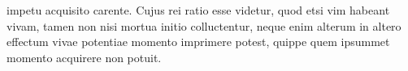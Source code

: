 %
impetu%
\protect{}
acquisito carente.
%
Cujus rei ratio esse videtur,
quod etsi vim habeant vivam,%
\protect{}
tamen non nisi mortua%
\protect{} 
%
initio colluctentur,
neque enim alterum in altero
effectum%
\protect{}
vivae potentiae%
\protect{} 
%
momento imprimere potest,%
\protect{}
%
quippe quem ipsummet momento acquirere non potuit.
%
\pend
\count{}%
\count{}%
\count{}
%
%
%
%